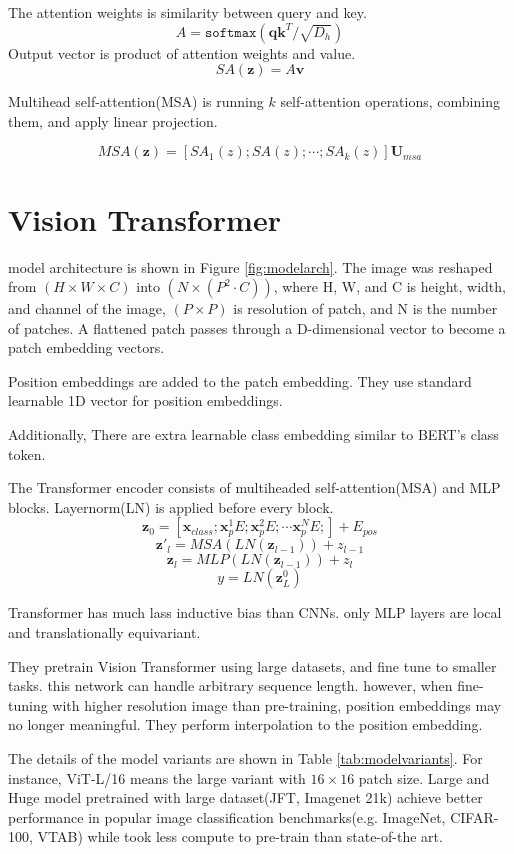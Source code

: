 \documentclass[extendedabs]{bmvc2k}
\begin{document}
The attention weights is similarity between query and key.
$$
A = \texttt{softmax}(\textbf{qk}^T/\sqrt{D_h})
$$
Output vector is product of attention weights and value.
$$
SA(\textbf{z}) = A\textbf{v}
$$

Multihead self-attention(MSA) is running $k$ self-attention operations, combining them, and apply linear projection.

$$
MSA(\textbf{z}) = [SA_1(z);SA(z);\cdots;SA_k(z)]\textbf{U}_{msa}
$$

\section{Vision Transformer}
model architecture is shown in Figure \ref{fig:modelarch}. The image was reshaped from $(H\times W \times C)$ into $(N\times (P^2 \cdot C))$, where H, W, and C is height, width, and channel of the image, $(P\times P)$ is resolution of patch, and N is the number of patches. A flattened patch passes through a D-dimensional vector to become a patch embedding vectors.

Position embeddings are added to the patch embedding. They use standard learnable 1D vector for position embeddings.

Additionally, There are extra learnable class embedding similar to BERT's class token.

The Transformer encoder consists of multiheaded self-attention(MSA) and MLP blocks. Layernorm(LN) is applied before every block.
$$
\textbf{z}_0 =[\textbf{x}_{class};\textbf{x}_p^1E;\textbf{x}_p^2E;\cdots \textbf{x}_p^NE;] + E_{pos} 
$$
$$
\textbf{z}'_l = MSA(LN(\textbf{z}_{l-1})) + z_{l-1} 
$$
$$
\textbf{z}_l = MLP(LN(\textbf{z}_{l-1})) + z_{l} 
$$
$$
y=LN(\textbf{z}_L^0)
$$

Transformer has much lass inductive bias than CNNs. only MLP layers are local and translationally equivariant.

They pretrain Vision Transformer using large datasets, and fine tune to smaller tasks. this network can handle arbitrary sequence length. however, when fine-tuning with higher resolution image than pre-training, position embeddings may no longer meaningful. They perform interpolation to the position embedding.

The details of the model variants are shown in Table \ref{tab:modelvariants}. For instance, ViT-L/16 means the large variant with $16\times16$ patch size. Large and Huge model pretrained with large dataset(JFT, Imagenet 21k) achieve better performance in popular image classification benchmarks(e.g. ImageNet, CIFAR-100, VTAB) while took less compute to pre-train than state-of-the art.
\end{document}
